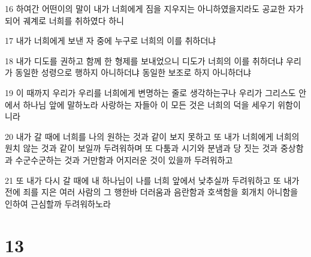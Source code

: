 \par 16 하여간 어떤이의 말이 내가 너희에게 짐을 지우지는 아니하였을지라도 공교한 자가 되어 궤계로 너희를 취하였다 하니
\par 17 내가 너희에게 보낸 자 중에 누구로 너희의 이를 취하더냐
\par 18 내가 디도를 권하고 함께 한 형제를 보내었으니 디도가 너희의 이를 취하더냐 우리가 동일한 성령으로 행하지 아니하더냐 동일한 보조로 하지 아니하더냐
\par 19 이 때까지 우리가 우리를 너희에게 변명하는 줄로 생각하는구나 우리가 그리스도 안에서 하나님 앞에 말하노라 사랑하는 자들아 이 모든 것은 너희의 덕을 세우기 위함이니라
\par 20 내가 갈 때에 너희를 나의 원하는 것과 같이 보지 못하고 또 내가 너희에게 너희의 원치 않는 것과 같이 보일까 두려워하며 또 다툼과 시기와 분냄과 당 짓는 것과 중상함과 수군수군하는 것과 거만함과 어지러운 것이 있을까 두려워하고
\par 21 또 내가 다시 갈 때에 내 하나님이 나를 너희 앞에서 낮추실까 두려워하고 또 내가 전에 죄를 지은 여러 사람의 그 행한바 더러움과 음란함과 호색함을 회개치 아니함을 인하여 근심할까 두려워하노라

\chapter{13}

